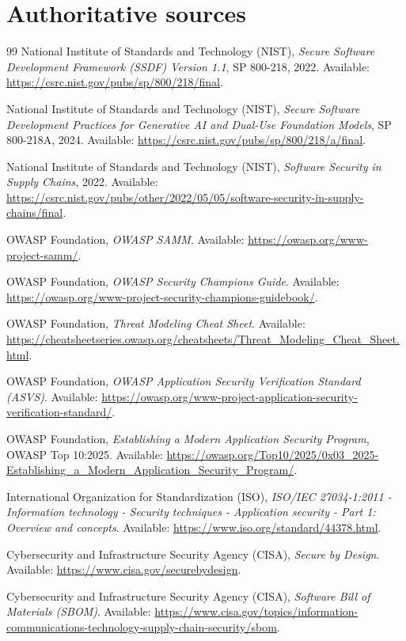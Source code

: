 \documentclass[11pt]{article}
\begin{document}
\section*{Authoritative sources}
\begingroup\sloppy
\begin{thebibliography}{99}
National Institute of Standards and Technology (NIST), \emph{Secure Software Development Framework (SSDF) Version 1.1}, SP 800-218, 2022. Available: \url{https://csrc.nist.gov/pubs/sp/800/218/final}.

National Institute of Standards and Technology (NIST), \emph{Secure Software Development Practices for Generative AI and Dual-Use Foundation Models}, SP 800-218A, 2024. Available: \url{https://csrc.nist.gov/pubs/sp/800/218/a/final}.

National Institute of Standards and Technology (NIST), \emph{Software Security in Supply Chains}, 2022. Available: \url{https://csrc.nist.gov/pubs/other/2022/05/05/software-security-in-supply-chains/final}.

OWASP Foundation, \emph{OWASP SAMM}. Available: \url{https://owasp.org/www-project-samm/}.

OWASP Foundation, \emph{OWASP Security Champions Guide}. Available: \url{https://owasp.org/www-project-security-champions-guidebook/}.

OWASP Foundation, \emph{Threat Modeling Cheat Sheet}. Available: \url{https://cheatsheetseries.owasp.org/cheatsheets/Threat_Modeling_Cheat_Sheet.html}.

OWASP Foundation, \emph{OWASP Application Security Verification Standard (ASVS)}. Available: \url{https://owasp.org/www-project-application-security-verification-standard/}.

OWASP Foundation, \emph{Establishing a Modern Application Security Program}, OWASP Top 10:2025. Available: \url{https://owasp.org/Top10/2025/0x03_2025-Establishing_a_Modern_Application_Security_Program/}.

International Organization for Standardization (ISO), \emph{ISO/IEC 27034-1:2011 - Information technology - Security techniques - Application security - Part 1: Overview and concepts}. Available: \url{https://www.iso.org/standard/44378.html}.

Cybersecurity and Infrastructure Security Agency (CISA), \emph{Secure by Design}. Available: \url{https://www.cisa.gov/securebydesign}.

Cybersecurity and Infrastructure Security Agency (CISA), \emph{Software Bill of Materials (SBOM)}. Available: \url{https://www.cisa.gov/topics/information-communications-technology-supply-chain-security/sbom}.
\end{thebibliography}
\endgroup
\end{document}
